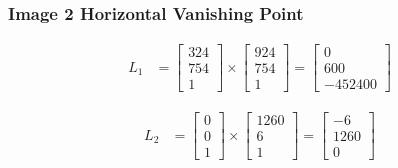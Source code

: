 \documentclass[12pt, oneside]{article}
\begin{document}
\subsubsection*{Image 2 Horizontal Vanishing Point}

\begin{align*}
    L_1 &=    \begin{bmatrix}
                324 \\
                754 \\
                1
            \end{bmatrix} \times 
            \begin{bmatrix}
                924 \\
                754 \\
                1
            \end{bmatrix}  = 
            \begin{bmatrix}
                0  \\
                600 \\
                -452400 
            \end{bmatrix}                                                   
    \end{align*}
    
    \begin{align*}
    L_2 &=    \begin{bmatrix}
                0 \\
                0 \\
                1
            \end{bmatrix} \times 
            \begin{bmatrix}
                1260 \\
                6 \\
                1
            \end{bmatrix}  = 
            \begin{bmatrix}
                -6  \\
                1260 \\
                0 
            \end{bmatrix}                                                   
    \end{align*}
    
\end{document}
